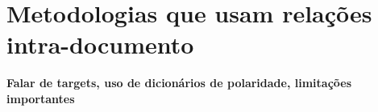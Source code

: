 \chapter{Metodologias que usam relações intra-documento}

\textbf{Falar de targets, uso de dicionários de polaridade, limitações importantes}

